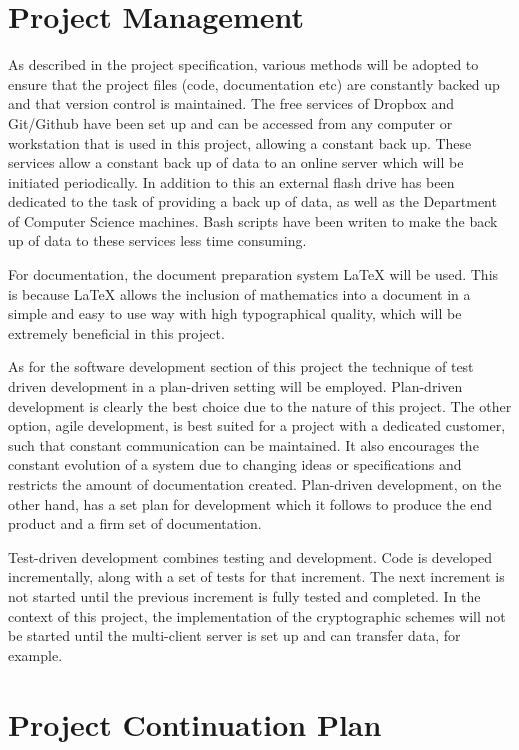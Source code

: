 \documentclass[a4paper,11pt]{article}
\begin{document}
\section{Project Management}

As described in the project specification, various methods will be adopted to ensure that the project files (code, documentation etc) are constantly backed up and that version control is maintained. The free services of Dropbox and Git/Github have been set up and can be accessed from any computer or workstation that is used in this project, allowing a constant back up. These services allow a constant back up of data to an online server which will be initiated periodically. In addition to this an external flash drive has been dedicated to the task of providing a back up of data, as well as the Department of Computer Science machines. Bash scripts have been writen to make the back up of data to these services less time consuming.

For documentation, the document preparation system LaTeX will be used. This is because LaTeX allows the inclusion of mathematics into a document in a simple and easy to use way with high typographical quality, which will be extremely beneficial in this project. 

As for the software development section of this project the technique of test driven development in a plan-driven setting will be employed. Plan-driven development is clearly the best choice due to the nature of this project. The other option, agile development, is best suited for a project with a dedicated customer, such that constant communication can be maintained. It also encourages the constant evolution of a system due to changing ideas or specifications and restricts the amount of documentation created. Plan-driven development, on the other hand, has a set plan for development which it follows to produce the end product and a firm set of documentation. 

Test-driven development combines testing and development. Code is developed incrementally, along with a set of tests for that increment. The next increment is not started until the previous increment is fully tested and completed. In the context of this project, the implementation of the cryptographic schemes will not be started until the multi-client server is set up and can transfer data, for example. 

\section{Project Continuation Plan}
\end{document}
